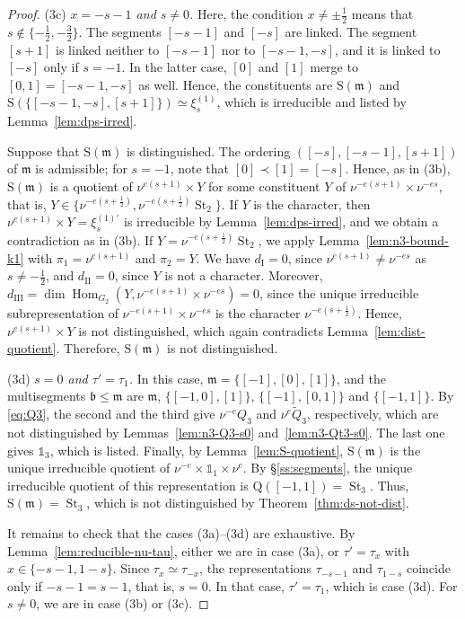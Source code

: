 \documentclass[11pt]{amsart}
\numberwithin{equation}{section}
\theoremstyle{plain}
\theoremstyle{definition}
\theoremstyle{remark}
\newcommand{\one}{\mathds{1}}
\DeclareMathOperator{\Hom}{Hom}
\DeclareMathOperator{\St}{St}
\newcommand{\Qt}{\widetilde{Q}}
\newcommand{\xione}{\xi^{(1)}}
\newcommand{\mm}{\mathfrak{m}}
\newcommand{\bb}{\mathfrak{b}}
\newcommand{\Ss}{\mathrm{S}}
\newcommand{\Qq}{\mathrm{Q}}
\newcommand{\dI}{d_{\mathrm{I}}}
\newcommand{\dII}{d_{\mathrm{II}}}
\newcommand{\dIII}{d_{\mathrm{III}}}
\begin{document}
\begin{proof}
	(3c) \emph{$x=-s-1$ and $s\ne0$.} Here, the condition $x\ne\pm\frac12$ means that $s\notin\{-\frac12,-\frac32\}$. The segments $[-s-1]$ and $[-s]$ are linked. The segment $[s+1]$ is linked neither to $[-s-1]$ nor to $[-s-1,-s]$, and it is linked to $[-s]$ only if $s=-1$. In the latter case, $[0]$ and $[1]$ merge to $[0,1]=[-s-1,-s]$ as well. Hence, the constituents are $\Ss(\mm)$ and $\Ss(\{[-s-1,-s],[s+1]\})\simeq\xione_s$, which is irreducible and listed by Lemma~\ref{lem:dps-irred}.
	
	Suppose that $\Ss(\mm)$ is distinguished. The ordering $([-s],[-s-1],[s+1])$ of $\mm$ is admissible; for $s=-1$, note that $[0]\prec[1]=[-s]$. Hence, as in (3b), $\Ss(\mm)$ is a quotient of $\nu^{e(s+1)}\times Y$ for some constituent $Y$ of $\nu^{-e(s+1)}\times\nu^{-es}$, that is, $Y\in\{\nu^{-e(s+\frac12)},\nu^{-e(s+\frac12)}\St_2\}$. If $Y$ is the character, then $\nu^{e(s+1)}\times Y=\xi^{(1)\prime}_s$ is irreducible by Lemma~\ref{lem:dps-irred}, and we obtain a contradiction as in (3b). If $Y=\nu^{-e(s+\frac12)}\St_2$, we apply Lemma~\ref{lem:n3-bound-k1} with $\pi_1=\nu^{e(s+1)}$ and $\pi_2=Y$. We have $\dI=0$, since $\nu^{e(s+1)}\ne\nu^{-es}$ as $s\ne-\frac12$, and $\dII=0$, since $Y$ is not a character. Moreover, $\dIII=\dim\Hom_{G_2}(Y,\nu^{-e(s+1)}\times\nu^{-es})=0$, since the unique irreducible subrepresentation of $\nu^{-e(s+1)}\times\nu^{-es}$ is the character $\nu^{-e(s+\frac12)}$. Hence, $\nu^{e(s+1)}\times Y$ is not distinguished, which again contradicts Lemma~\ref{lem:dist-quotient}. Therefore, $\Ss(\mm)$ is not distinguished.
	
	(3d) \emph{$s=0$ and $\tau'=\tau_1$.} In this case, $\mm=\{[-1],[0],[1]\}$, and the multisegments $\bb\le\mm$ are $\mm$, $\{[-1,0],[1]\}$, $\{[-1],[0,1]\}$ and $\{[-1,1]\}$. By \eqref{eq:Q3}, the second and the third give $\nu^{-e}Q_3$ and $\nu^e\Qt_3$, respectively, which are not distinguished by Lemmas~\ref{lem:n3-Q3-s0} and~\ref{lem:n3-Qt3-s0}. The last one gives $\one_3$, which is listed. Finally, by Lemma~\ref{lem:S-quotient}, $\Ss(\mm)$ is the unique irreducible quotient of $\nu^{-e}\times\one_1\times\nu^e$. By \S\ref{ss:segments}, the unique irreducible quotient of this representation is $\Qq([-1,1])=\St_3$. Thus, $\Ss(\mm)=\St_3$, which is not distinguished by Theorem~\ref{thm:ds-not-dist}.
	
	It remains to check that the cases (3a)--(3d) are exhaustive. By Lemma~\ref{lem:reducible-nu-tau}, either we are in case (3a), or $\tau'=\tau_x$ with $x\in\{-s-1,1-s\}$. Since $\tau_x\simeq\tau_{-x}$, the representations $\tau_{-s-1}$ and $\tau_{1-s}$ coincide only if $-s-1=s-1$, that is, $s=0$. In that case, $\tau'=\tau_1$, which is case (3d). For $s\ne0$, we are in case (3b) or (3c).
\end{proof}
\end{document}

